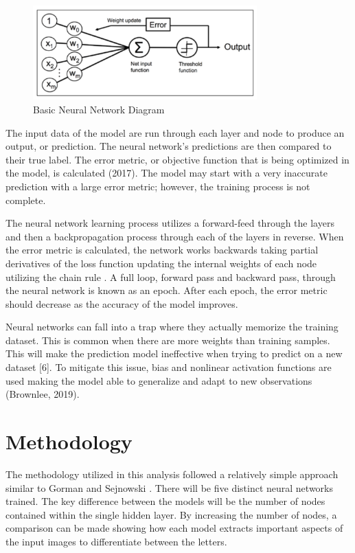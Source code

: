\documentclass[5p,authoryear]{elsarticle}
\begin{document}
\begin{figure}[!htb] \centering
	\includegraphics[width=3.4in]{figures/Figure nn.png}
	\caption[]{Basic Neural Network Diagram} 
	\label{basic} 
\end{figure}

The input data of the model are run through each layer and node to produce an output, or prediction. The neural network’s predictions are then compared to their true label. The error metric, or objective function that is being optimized in the model, is calculated (2017). The model may start with a very inaccurate prediction with a large error metric; however, the training process is not complete.

The neural network learning process utilizes a forward-feed through the layers and then a backpropagation process through each of the layers in reverse. When the error metric is calculated, the network works backwards taking partial derivatives of the loss function updating the internal weights of each node utilizing the chain rule \citep{brownlee}. A full loop, forward pass and backward pass, through the neural network is known as an epoch. After each epoch, the error metric should decrease as the accuracy of the model improves. 

Neural networks can fall into a trap where they actually memorize the training dataset. This is common when there are more weights than training samples. This will make the prediction model ineffective when trying to predict on a new dataset [6]. To mitigate this issue, bias and nonlinear activation functions are used making the model able to generalize and adapt to new observations (Brownlee, 2019).



\section{Methodology}\label{meth}

The methodology utilized in this analysis followed a relatively simple approach similar to Gorman and Sejnowski \citep{gorman}. 
There will be five distinct neural networks trained. 
The key difference between the models will be the number of nodes contained within the single hidden layer. 
By increasing the number of nodes, a comparison can be made showing how each model extracts important aspects of the input images to differentiate between the letters. 
\end{document}
